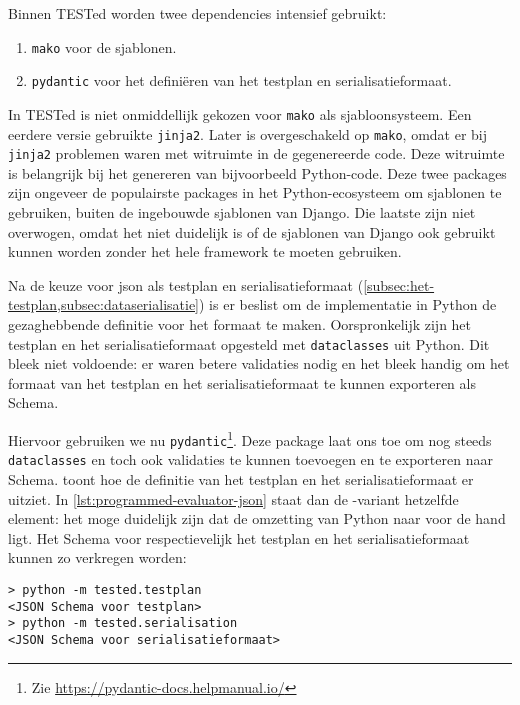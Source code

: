Binnen TESTed worden twee dependencies intensief gebruikt:

\begin{enumerate}
    \item \texttt{mako} voor de sjablonen.
    \item \texttt{pydantic} voor het definiëren van het testplan en serialisatieformaat.
\end{enumerate}

In TESTed is niet onmiddellijk gekozen voor \texttt{mako} als sjabloonsysteem.
Een eerdere versie gebruikte \texttt{jinja2}.
Later is overgeschakeld op \texttt{mako}, omdat er bij \texttt{jinja2} problemen waren met witruimte in de gegenereerde code.
Deze witruimte is belangrijk bij het genereren van bijvoorbeeld Python-code.
Deze twee packages zijn ongeveer de populairste packages in het Python-ecosysteem om sjablonen te gebruiken, buiten de ingebouwde sjablonen van Django.
Die laatste zijn niet overwogen, omdat het niet duidelijk is of de sjablonen van Django ook gebruikt kunnen worden zonder het hele framework te moeten gebruiken.

Na de keuze voor json als testplan en serialisatieformaat (\cref{subsec:het-testplan,subsec:dataserialisatie}) is er beslist om de implementatie in Python de gezaghebbende definitie voor het formaat te maken.
Oorspronkelijk zijn het testplan en het serialisatieformaat opgesteld met \texttt{dataclasses} uit Python.
Dit bleek niet voldoende: er waren betere validaties nodig en het bleek handig om het formaat van het testplan en het serialisatieformaat te kunnen exporteren als  Schema.

Hiervoor gebruiken we nu \texttt{pydantic}\footnote{Zie \url{https://pydantic-docs.helpmanual.io/}}.
Deze package laat ons toe om nog steeds \texttt{dataclasses} en toch ook validaties te kunnen toevoegen en te exporteren naar  Schema.
 toont hoe de definitie van het testplan en het serialisatieformaat er uitziet.
In \cref{lst:programmed-evaluator-json} staat dan de -variant hetzelfde element: het moge duidelijk zijn dat de omzetting van Python naar  voor de hand ligt.
Het  Schema voor respectievelijk het testplan en het serialisatieformaat kunnen zo verkregen worden:

\begin{verbatim}
> python -m tested.testplan
<JSON Schema voor testplan>
> python -m tested.serialisation
<JSON Schema voor serialisatieformaat>
\end{verbatim}

